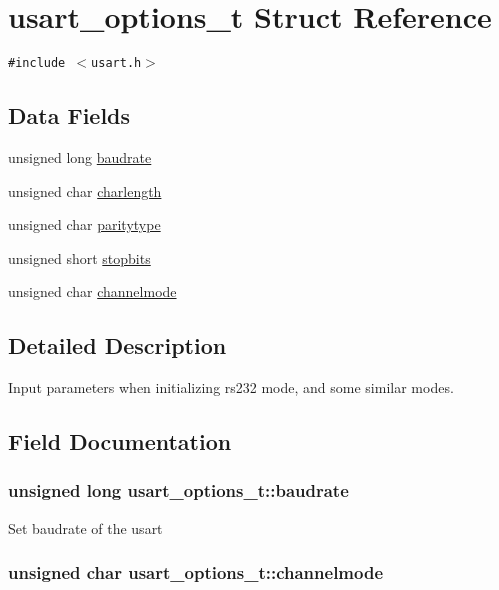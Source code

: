 \hypertarget{structusart__options__t}{
\section{usart\_\-options\_\-t Struct Reference}
\label{structusart__options__t}
}
{\tt \#include $<$usart.h$>$}

\subsection*{Data Fields}
\begin{CompactItemize}
\item 
unsigned long \hyperlink{structusart__options__t_276ad428776a25b8247762bd2c82b35b}{baudrate}
\item 
unsigned char \hyperlink{structusart__options__t_a6b77cc05829d2e70ee7f96194c6ce23}{charlength}
\item 
unsigned char \hyperlink{structusart__options__t_85401f7a6f516a5883adc0538dc27f8e}{paritytype}
\item 
unsigned short \hyperlink{structusart__options__t_433a6ede2186d42b4cf19ef4b370cd61}{stopbits}
\item 
unsigned char \hyperlink{structusart__options__t_0dc365b8779891743180e9b69116f5ea}{channelmode}
\end{CompactItemize}


\subsection{Detailed Description}
Input parameters when initializing rs232 mode, and some similar modes. 

\subsection{Field Documentation}
\hypertarget{structusart__options__t_276ad428776a25b8247762bd2c82b35b}{
\subsubsection[{baudrate}]{\setlength{\rightskip}{0pt plus 5cm}unsigned long {\bf usart\_\-options\_\-t::baudrate}}}
\label{structusart__options__t_276ad428776a25b8247762bd2c82b35b}


Set baudrate of the usart \hypertarget{structusart__options__t_0dc365b8779891743180e9b69116f5ea}{
\subsubsection[{channelmode}]{\setlength{\rightskip}{0pt plus 5cm}unsigned char {\bf usart\_\-options\_\-t::channelmode}}}
\label{structusart__options__t_0dc365b8779891743180e9b69116f5ea}


